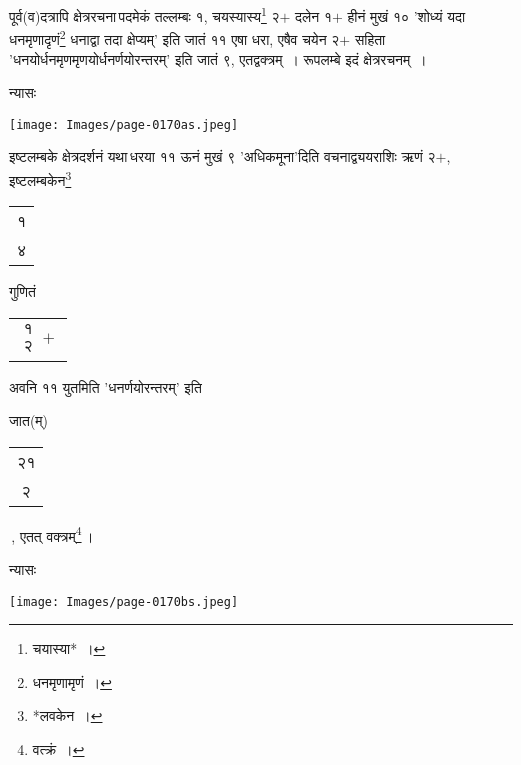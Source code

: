 \documentclass[10pt, openany]{book}
\begin{document}
{{{{{{पूर्व(व)दत्रापि क्षेत्ररचना\textendash \,पदमेकं तल्लम्बः १, चयस्यास्य\renewcommand{\thefootnote}{७}\footnote{चयास्या*~।} २$+$
दलेन १$+$ हीनं मुखं}
{१० {\qt 'शोध्यं यदा धनमृणादृणं\renewcommand{\thefootnote}{८}\footnote{धनमृणामृणं~।} धनाद्वा तदा क्षेप्यम्'} इति जातं ११ एषा
धरा, एषैव चयेन २$+$}
{सहिता {\qt 'धनयोर्धनमृणमृणयोर्धनर्णयोरन्तरम्'} इति जातं ९, एतद्वक्त्रम्~। रूपलम्बे इदं क्षेत्ररचनम्~।}
\vspace{3mm}

{न्यासः\textendash \,}
\vspace{-2mm}

\hspace{15mm} \texttt{[image: Images/page-0170as.jpeg]} 
\vspace{3mm}

{इष्टलम्बके क्षेत्रदर्शनं यथा\textendash \,धरया ११ ऊनं मुखं ९ {\qt 'अधिकमूना'}दिति
वचनाद्व्ययराशिः ऋणं २$+$, इष्टलम्बकेन\renewcommand{\thefootnote}{९}\footnote{*लवकेन~।} \begin{tabular}{|c|} १\\ ४\end{tabular}  गुणितं \begin{tabular}{|c|}$\begin{matrix}
\mbox{{१}}\\
\mbox{{२}}
\end{matrix}+$ \end{tabular} अवनि ११ युतमिति
{\qt 'धनर्णयोरन्तरम्'} इति}
{जात(म्) \begin{tabular}{|c|} २१\\ २
\end{tabular}\,, एतत् वक्त्रम्\renewcommand{\thefootnote}{१०}\footnote{वत्क्रं~।}\,।}
\vspace{3mm}

{न्यासः\textendash \,}

\hspace{2mm} \texttt{[image: Images/page-0170bs.jpeg]} 

}}}}}
\end{document}
